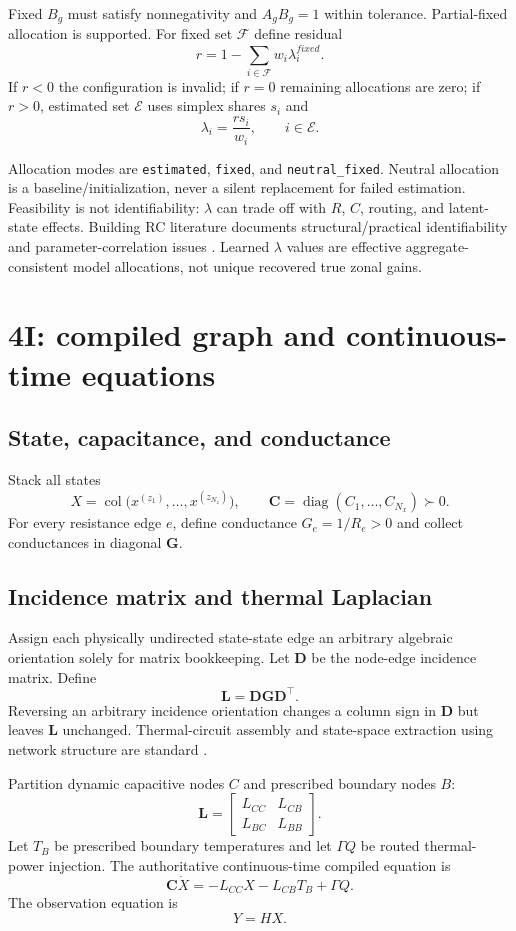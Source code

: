 \documentclass[11pt]{article}
\newcommand{\diag}{\operatorname{diag}}
\newcommand{\col}{\operatorname{col}}
\begin{document}
Fixed $B_g$ must satisfy nonnegativity and $A_gB_g=1$ within tolerance. Partial-fixed allocation is supported. For fixed set $\mathcal F$ define residual
\[
r=1-\sum_{i\in\mathcal F}w_i\lambda_i^{fixed}.
\]
If $r<0$ the configuration is invalid; if $r=0$ remaining allocations are zero; if $r>0$, estimated set $\mathcal E$ uses simplex shares $s_i$ and
\[
\lambda_i=\frac{r s_i}{w_i},\qquad i\in\mathcal E.
\]

Allocation modes are \texttt{estimated}, \texttt{fixed}, and \texttt{neutral\_fixed}. Neutral allocation is a baseline/initialization, never a silent replacement for failed estimation. Feasibility is not identifiability: $\lambda$ can trade off with $R$, $C$, routing, and latent-state effects. Building RC literature documents structural/practical identifiability and parameter-correlation issues \citep{AgbiSongKrogh2012Identifiability,MartyJourjonEtAl2022RCIdentifiability}. Learned $\lambda$ values are effective aggregate-consistent model allocations, not unique recovered true zonal gains.

\section{4I: compiled graph and continuous-time equations}
\subsection{State, capacitance, and conductance}
Stack all states
\[
X=\col\bigl(x^{(z_1)},\ldots,x^{(z_{N_z})}\bigr),
\qquad
\mathbf C=\diag(C_1,\ldots,C_{N_x})\succ0.
\]
For every resistance edge $e$, define conductance $G_e=1/R_e>0$ and collect conductances in diagonal $\mathbf G$.

\subsection{Incidence matrix and thermal Laplacian}
Assign each physically undirected state-state edge an arbitrary algebraic orientation solely for matrix bookkeeping. Let $\mathbf D$ be the node-edge incidence matrix. Define
\[
\boxed{\mathbf L=\mathbf D\mathbf G\mathbf D^\top.}
\]
Reversing an arbitrary incidence orientation changes a column sign in $\mathbf D$ but leaves $\mathbf L$ unchanged.  Thermal-circuit assembly and state-space extraction using network structure are standard \citep{GhiausAhmad2020ThermalCircuits}.

Partition dynamic capacitive nodes $C$ and prescribed boundary nodes $B$:
\[
\mathbf L=\begin{bmatrix}L_{CC}&L_{CB}\\L_{BC}&L_{BB}\end{bmatrix}.
\]
Let $T_B$ be prescribed boundary temperatures and let $\Gamma Q$ be routed thermal-power injection. The authoritative continuous-time compiled equation is
\[
\boxed{
\mathbf C\dot X=-L_{CC}X-L_{CB}T_B+\Gamma Q.
}
\]
The observation equation is
\[
\boxed{Y=HX.}
\]
\end{document}
